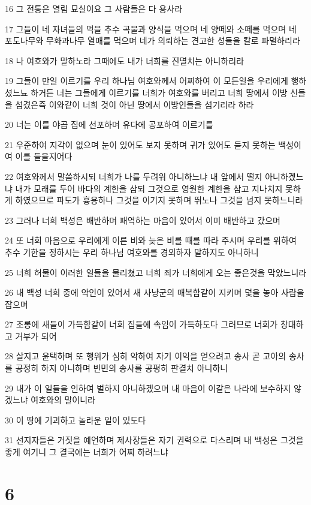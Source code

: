 \par 16 그 전통은 열림 묘실이요 그 사람들은 다 용사라
\par 17 그들이 네 자녀들의 먹을 추수 곡물과 양식을 먹으며 네 양떼와 소떼를 먹으며 네 포도나무와 무화과나무 열매를 먹으며 네가 의뢰하는 견고한 성들을 칼로 파멸하리라
\par 18 나 여호와가 말하노라 그때에도 내가 너희를 진멸치는 아니하리라
\par 19 그들이 만일 이르기를 우리 하나님 여호와께서 어찌하여 이 모든일을 우리에게 행하셨느뇨 하거든 너는 그들에게 이르기를 너희가 여호와를 버리고 너희 땅에서 이방 신들을 섬겼은즉 이와같이 너희 것이 아닌 땅에서 이방인들을 섬기리라 하라
\par 20 너는 이를 야곱 집에 선포하며 유다에 공포하여 이르기를
\par 21 우준하여 지각이 없으며 눈이 있어도 보지 못하며 귀가 있어도 듣지 못하는 백성이여 이를 들을지어다
\par 22 여호와께서 말씀하시되 너희가 나를 두려워 아니하느냐 내 앞에서 떨지 아니하겠느냐 내가 모래를 두어 바다의 계한을 삼되 그것으로 영원한 계한을 삼고 지나치지 못하게 하였으므로 파도가 흉용하나 그것을 이기지 못하며 뛰노나 그것을 넘지 못하느니라
\par 23 그러나 너희 백성은 배반하며 패역하는 마음이 있어서 이미 배반하고 갔으며
\par 24 또 너희 마음으로 우리에게 이른 비와 늦은 비를 때를 따라 주시며 우리를 위하여 추수 기한을 정하시는 우리 하나님 여호와를 경외하자 말하지도 아니하니
\par 25 너희 허물이 이러한 일들을 물리쳤고 너희 죄가 너희에게 오는 좋은것을 막았느니라
\par 26 내 백성 너희 중에 악인이 있어서 새 사냥군의 매복함같이 지키며 덫을 놓아 사람을 잡으며
\par 27 조롱에 새들이 가득함같이 너희 집들에 속임이 가득하도다 그러므로 너희가 창대하고 거부가 되어
\par 28 살지고 윤택하며 또 행위가 심히 악하여 자기 이익을 얻으려고 송사 곧 고아의 송사를 공정히 하지 아니하며 빈민의 송사를 공평히 판결치 아니하니
\par 29 내가 이 일들을 인하여 벌하지 아니하겠으며 내 마음이 이같은 나라에 보수하지 않겠느냐 여호와의 말이니라
\par 30 이 땅에 기괴하고 놀라운 일이 있도다
\par 31 선지자들은 거짓을 예언하며 제사장들은 자기 권력으로 다스리며 내 백성은 그것을 좋게 여기니 그 결국에는 너희가 어찌 하려느냐

\chapter{6}

